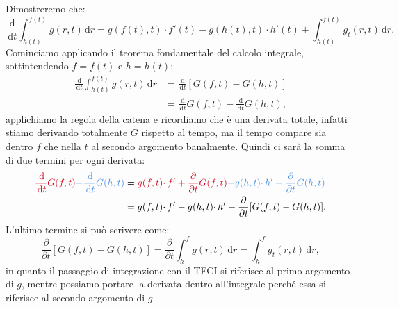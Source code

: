 \documentclass[10pt,a4paper,twoside,openright]{book}
\newcommand{\de}{\,\mathrm d}
\newcommand{\dr}{\de r}
\newcommand{\dt}{\de t}
\begin{document}
\begin{nb}
	Dimostreremo che:
	\begin{equation*}
		\frac{\de}{\dt}\int _{h(t)}^{f(t)} g(r,t) \dr=g(f(t) ,t) \cdotp f'(t) -g(h(t) ,t) \cdotp h'(t) +\int _{h(t)}^{f(t)} g_{t}(r,t) \dr.
	\end{equation*}
	Cominciamo applicando il teorema fondamentale del calcolo integrale, sottintendendo $f=f(t)$ e $h=h(t)$:
	\begin{align*}
	\frac{\de}{\dt}\int _{h(t)}^{f(t)} g(r,t) \dr & =\frac{\de}{\dt}[ G(f,t) -G(h,t)]\\
	 											 & =\frac{\de}{\dt} G(f,t) -\frac{\de}{\dt} G(h,t) ,
	\end{align*}
	applichiamo la regola della catena e ricordiamo che è una derivata totale, infatti stiamo derivando totalmente $G$ rispetto al tempo, ma il tempo compare sia dentro $f$ che nella $t$ al secondo argomento banalmente. Quindi ci sarà la somma di due termini per ogni derivata:
	\begin{align*}
		\textcolor[rgb]{0.82,0.01,0.11}{\frac{\de}{\dt} G(f,t)}\textcolor[rgb]{0.29,0.56,0.89}{-\frac{\de}{\dt} G(h,t)} & =\textcolor[rgb]{0.82,0.01,0.11}{g(f,t) \cdotp f'+\frac{\partial }{\partial t} G(f,t)}\textcolor[rgb]{0.29,0.56,0.89}{-g(h,t) \cdotp h'-\frac{\partial }{\partial t} G(h,t)}\\
	 																												& =g(f,t) \cdotp f'-g(h,t) \cdotp h'-\frac{\partial }{\partial t}[ G(f,t) -G(h,t)] .
	\end{align*}
	L'ultimo termine si può scrivere come:
	\begin{equation*}
		\frac{\partial }{\partial t}[ G(f,t) -G(h,t)] =\frac{\partial }{\partial t}\int _{h}^{f} g(r,t) \dr=\int _{h}^{f} g_{t}(r,t) \dr,
	\end{equation*}
	in quanto il passaggio di integrazione con il TFCI si riferisce al primo argomento di $g$, mentre possiamo portare la derivata dentro all'integrale perché essa si riferisce al secondo argomento di $g$.
\end{nb}
\end{document}
